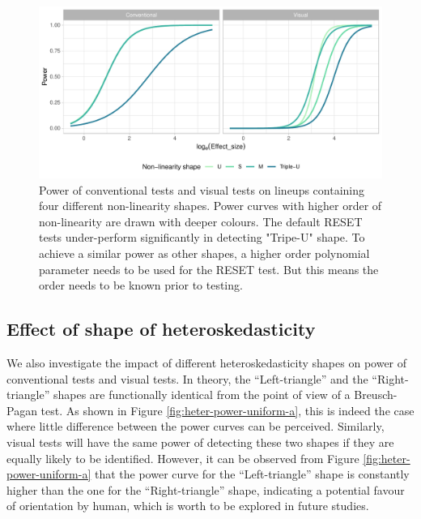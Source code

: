 \documentclass[]{interact}
\theoremstyle{plain}%
\theoremstyle{definition}
\theoremstyle{remark}
\begin{document}
\begin{figure}

{\centering \includegraphics[width=1\linewidth]{paper_comparison_files/figure-latex/poly-power-uniform-j-1} 

}

\caption{Power of conventional tests and visual tests on lineups containing four different non-linearity shapes. Power curves with higher order of non-linearity are drawn with deeper colours. The default RESET tests under-perform significantly in detecting "Tripe-U" shape. To achieve a similar power as other shapes, a higher order polynomial parameter needs to be used for the RESET test. But this means the order needs to be known prior to testing.}\label{fig:poly-power-uniform-j}
\end{figure}

\hypertarget{effect-of-shape-of-heteroskedasticity}{%
\subsection{Effect of shape of
heteroskedasticity}\label{effect-of-shape-of-heteroskedasticity}}

We also investigate the impact of different heteroskedasticity shapes on
power of conventional tests and visual tests. In theory, the
``Left-triangle'' and the ``Right-triangle'' shapes are functionally
identical from the point of view of a Breusch-Pagan test. As shown in
Figure \ref{fig:heter-power-uniform-a}, this is indeed the case where
little difference between the power curves can be perceived. Similarly,
visual tests will have the same power of detecting these two shapes if
they are equally likely to be identified. However, it can be observed
from Figure \ref{fig:heter-power-uniform-a} that the power curve for the
``Left-triangle'' shape is constantly higher than the one for the
``Right-triangle'' shape, indicating a potential favour of orientation
by human, which is worth to be explored in future studies.
\end{document}
